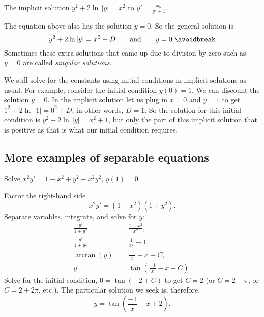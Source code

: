\begin{myfig}
\capstart
{}
\caption{The implicit solution $y^2+2\ln \, \lvert y\rvert = x^2$
to $y'=\frac{xy}{y^2+1}$.\label{implicitsols:fig}}
\end{myfig}

The equation above also has the solution $y=0$.
So the general solution is 
\begin{equation*}
y^2 + 2 \ln \, \lvert y \rvert = x^2 + D \qquad \text{and} \qquad y=0.
\avoidbreak
\end{equation*}
Sometimes these extra solutions that came up 
due to division by zero such as
$y=0$
are called \emph{singular solutions}.

We still solve for the constants using initial conditions in implicit
solutions as usual.  For example, consider the initial condition
$y(0)=1$.  We can discount the solution $y=0$.  In the implicit solution
let us plug in $x=0$ and $y=1$ to get $1^2 + 2 \ln \, \lvert 1 \rvert = 0^2 +
D$, in other words, $D=1$.  So the solution for this initial condition
is $y^2 + 2 \ln \, \lvert y \rvert = x^2 + 1$, but only the part of this
implicit solution that is positive as that is what our initial condition requires.

\subsection{More examples of separable equations}

\begin{example}
Solve $x^2y' = 1 - x^2+y^2 - x^2y^2$, $y(1) = 0$.

Factor the right-hand side
\begin{equation*}
x^2y' = (1 - x^2)(1+y^2) .
\end{equation*}
Separate variables, integrate, and solve for $y$:
\begin{align*}
\frac{y'}{1+y^2} & = \frac{1 - x^2}{x^2} , \\
\frac{y'}{1+y^2} & = \frac{1}{x^2} - 1 , \\
\operatorname{arctan} (y) & = \frac{-1}{x} - x + C , \\
y & = \tan \left(\frac{-1}{x} - x + C\right) .
\end{align*}
Solve for the initial condition, $0 = \tan(-2+C)$ to get $C=2$ (or $C = 2 +
\pi$, or $C = 2 + 2\pi$, etc.).  The particular solution we seek is, therefore,
\begin{equation*}
y = \tan \left(\frac{-1}{x} - x + 2 \right) .
\end{equation*}
\end{example}

